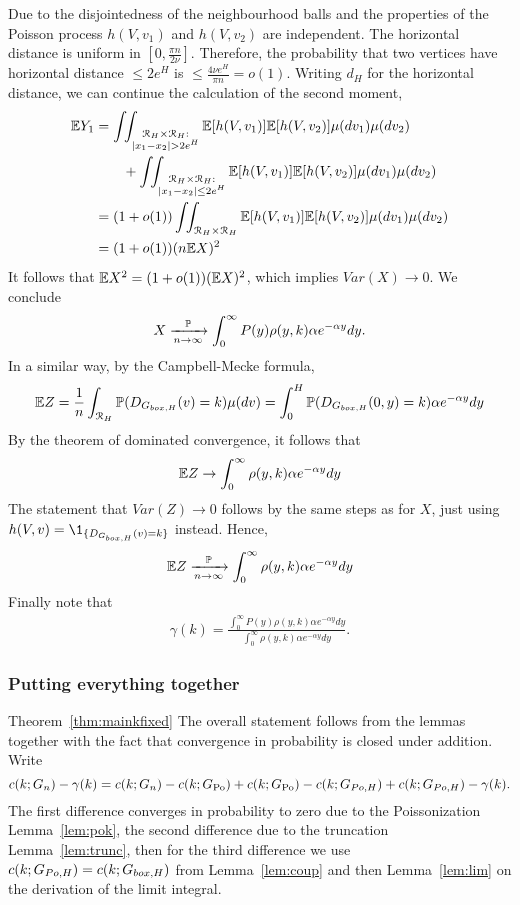 Due to the disjointedness of the neighbourhood balls and the properties of the Poisson process $h(V,v_1)$ and $h(V,v_2)$ are independent. The horizontal distance is uniform in $[0,\frac{\pi n}{2\nu}]$. Therefore, the probability that two vertices have horizontal distance $\leq 2e^H$ is $\leq \frac{4\nu e^H}{\pi n} = o(1)$. Writing $d_H$ for the horizontal distance, we can continue the calculation of the second moment,
\begin{align*}
\E Y_1 &= \int_{} \int_{\substack{\Rcal_H\times \Rcal_H:\\ |x_1-x_2|>2 e^H}} \E[ h(V,v_1)]\E[h(V,v_2)]\mu(dv_1)\mu(dv_2)\\
&\qquad+\int_{} \int_{\substack{\Rcal_H\times \Rcal_H:\\ |x_1-x_2|\leq2 e^H}} \E[ h(V,v_1)]\E[h(V,v_2)]\mu(dv_1)\mu(dv_2) \\
&= (1+o(1))\int_{} \int_{\Rcal_H\times \Rcal_H} \E[ h(V,v_1)]\E[h(V,v_2)]\mu(dv_1)\mu(dv_2) \\
&= (1+o(1)) (n\E X)^2%
\end{align*}
It follows that $\mathbb{E} X^2 = (1+o(1))(\mathbb{E} X)^2$, which implies $Var(X) \rightarrow 0$. We conclude
$$X \xrightarrow[n\rightarrow\infty]{\mathbb{P}} \int_0^\infty P(y)\rho(y,k)\alpha e^{-\alpha y}dy.$$
In a similar way, by the Campbell-Mecke formula,
\begin{align*}
\mathbb{E} Z =\frac{1}{n} \int_{{\mathcal R}_H} \mathbb{P}(D_{G_{box,H}}(v)=k) \mu(dv) = \int_0^H \mathbb{P}(D_{G_{box,H}}(0,y)=k) \alpha e^{-\alpha y}dy
\end{align*}
By the theorem of dominated convergence, it follows that
\begin{align*}
\mathbb{E} Z \rightarrow \int_0^\infty \rho(y,k)\alpha e^{-\alpha y}dy
\end{align*}
The statement that $Var(Z) \rightarrow 0$ follows by the same steps as for $X$, just using $h(V,v) = \1_{\{D_{\GboxH}(v)=k\}}$ instead. Hence,
\begin{align*}
\mathbb{E} Z \xrightarrow[n\rightarrow\infty]{\mathbb{P}} \int_0^\infty \rho(y,k)\alpha e^{-\alpha y}dy
\end{align*}
Finally note that 
\begin{align*}
\gamma(k) = \frac{\int_0^\infty P(y)\rho(y,k)\alpha e^{-\alpha y}dy}{\int_0^\infty \rho(y,k)\alpha e^{-\alpha y}dy}.
\end{align*}

\subsubsection{Putting everything together}
\begin{proofof}{Theorem~\ref{thm:mainkfixed}}
The overall statement follows from the lemmas together with the fact that convergence in probability is closed under addition.
Write 
$$c(k;G_n)-\gamma(k) = c(k;G_n) - c(k;G_{\text{Po}})+c(k;G_{\text{Po}})-c(k;G_{Po,H})+c(k;G_{Po,H})-\gamma(k).$$ 
The first difference converges in probability to zero due to the Poissonization Lemma~\ref{lem:pok}, the second difference due to the truncation Lemma~\ref{lem:trunc}, then for the third difference we use $c(k;G_{Po,H})=c(k;G_{box,H})$ from Lemma~\ref{lem:coup} and then Lemma~\ref{lem:lim} on the derivation of the limit integral.
\end{proofof}

